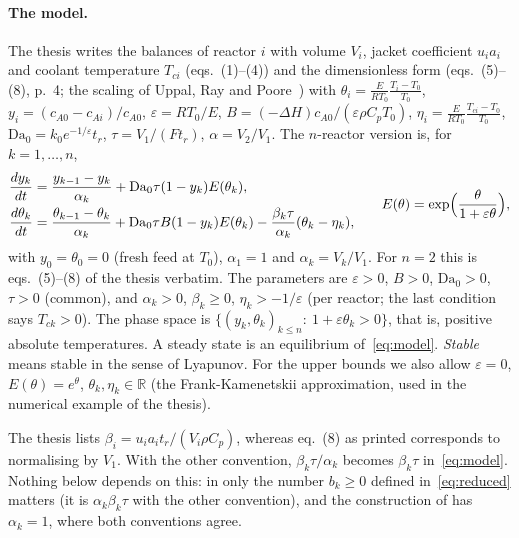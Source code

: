 \documentclass[11pt,a4paper]{report}
\newcommand*{\Da}{\mathrm{Da}_0}
\newcommand*{\eps}{\varepsilon}
\begin{document}
\paragraph{The model.} The thesis writes the balances of reactor \(i\) with volume \(V_i\), jacket coefficient
\(u_ia_i\) and coolant temperature \(T_{ci}\) (eqs.~(1)--(4)) and the dimensionless form (eqs.~(5)--(8), p.~4; the scaling of Uppal, Ray and Poore~\autocite{UppalRayPoore1976}) with
\(\theta_i=\frac{E}{RT_0}\frac{T_i-T_0}{T_0}\), \(y_i=(c_{A0}-c_{Ai})/c_{A0}\), \(\eps=RT_0/E\),
\(B=(-\Delta H)c_{A0}/(\eps\rho C_pT_0)\), \(\eta_i=\frac{E}{RT_0}\frac{T_{ci}-T_0}{T_0}\), \(\Da=k_0e^{-1/\eps}t_r\),
\(\tau=V_1/(Ft_r)\), \(\alpha=V_2/V_1\). The \(n\)-reactor version is, for \(k=1,\dots,n\),
\begin{equation}\label{eq:model}
\begin{aligned}
\frac{dy_k}{dt}&=\frac{y_{k-1}-y_k}{\alpha_k}+\Da\tau(1-y_k)E(\theta_k),\\
\frac{d\theta_k}{dt}&=\frac{\theta_{k-1}-\theta_k}{\alpha_k}+\Da\tau B(1-y_k)E(\theta_k)
-\frac{\beta_k\tau}{\alpha_k}(\theta_k-\eta_k),
\end{aligned}
\qquad E(\theta)=\exp\Bigl(\frac{\theta}{1+\eps\theta}\Bigr),
\end{equation}
with \(y_0=\theta_0=0\) (fresh feed at \(T_0\)), \(\alpha_1=1\) and \(\alpha_k=V_k/V_1\). For \(n=2\) this is eqs.~(5)--(8)
of the thesis verbatim. The parameters are \(\eps>0\), \(B>0\), \(\Da>0\), \(\tau>0\) (common), and \(\alpha_k>0\),
\(\beta_k\ge0\), \(\eta_k>-1/\eps\) (per reactor; the last condition says \(T_{ck}>0\)). The phase space is
\(\{(y_k,\theta_k)_{k\le n}:\ 1+\eps\theta_k>0\}\), that is, positive absolute temperatures. A steady state is an
equilibrium of~\eqref{eq:model}. \emph{Stable} means stable in the sense of Lyapunov.
For the upper bounds we also allow \(\eps=0\), \(E(\theta)=e^\theta\), \(\theta_k,\eta_k\in\mathbb R\) (the
Frank-Kamenetskii approximation, used in the numerical example of the thesis).

\begin{remark}[note={on \(\beta_k\)}]
The thesis lists \(\beta_i=u_ia_it_r/(V_i\rho C_p)\), whereas eq.~(8) as printed corresponds to normalising by
\(V_1\). With the other convention, \(\beta_k\tau/\alpha_k\) becomes \(\beta_k\tau\) in~\eqref{eq:model}. Nothing below
depends on this: in  only the number \(b_k\ge0\) defined in~\eqref{eq:reduced} matters (it is
\(\alpha_k\beta_k\tau\) with the other convention), and the construction of  has \(\alpha_k=1\), where
both conventions agree.
\end{remark}
\end{document}
